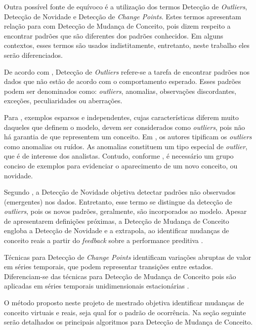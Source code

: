 \documentclass[qual, classic, a4paper]{ufbathesis}
\begin{document}
Outra possível fonte de equívoco é a utilização dos termos Detecção de \textit{Outliers}, Detecção de Novidade e Detecção de \textit{Change Points}.
Estes termos apresentam relação para com Detecção de Mudança de Conceito, pois dizem respeito a encontrar padrões que são diferentes dos padrões conhecidos.
Em alguns contextos, esses termos são usados indistitamente, entretanto, neste trabalho eles serão diferenciados.

De acordo com \cite{Chandola:2009:ADS:1541880.1541882}, 
Detecção de \textit{Outliers} refere-se a tarefa de encontrar padrões nos dados que não estão de acordo com o comportamento esperado.
Esses padrões podem ser denominados como: \textit{outliers}, anomalias, observações discordantes, exceções, peculiaridades ou aberrações.

Para \cite{Gama:2010:KDD:1855075}, exemplos esparsos e independentes, cujas características diferem muito daqueles que definem o modelo, 
devem ser considerados como \textit{outliers}, pois não há garantia de que representem um conceito. 
Em \cite{Aggarwal:2003:FCE:1315451.1315460}, os autores tipificam os \textit{outliers} como anomalias ou ruídos.
As anomalias constituem um tipo especial de \textit{outlier}, que é de interesse dos analistas.
Contudo, conforme \cite{Gama:2010:KDD:1855075}, é necessário um grupo conciso de exemplos para evidenciar o aparecimento de um novo conceito, ou novidade.

Segundo \cite{Chandola:2009:ADS:1541880.1541882}, a Detecção de Novidade objetiva detectar padrões não observados (emergentes) nos dados.
Entretanto, esse termo se distingue da detecção de \textit{outliers}, pois os novos padrões, geralmente, são incorporados ao modelo.
Apesar de apresentarem definições próximas, a Detecção de Mudança de Conceito engloba a Detecção de Novidade e a extrapola, ao identificar 
mudanças de conceito reais a partir do \textit{feedback} sobre a performance preditiva \cite{Gama:2010:KDD:1855075}.

Técnicas para Detecção de \textit{Change Points} identificam variações abruptas de valor em séries temporais, que podem representar transições entre estados.
Diferenciam-se das técnicas para Detecção de Mudança de Conceito pois são aplicadas em séries temporais unidimensionais estacionárias \cite{Aminikhanghahi:2017:SMT:3086013.3086037}.

O método proposto neste projeto de mestrado objetiva identificar mudanças de conceito virtuais e reais, seja qual for o padrão de ocorrência.
Na seção seguinte serão detalhados os principais algoritmos para Detecção de Mudança de Conceito.
\end{document}
